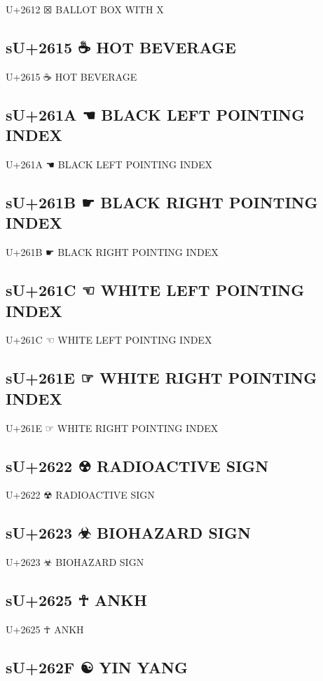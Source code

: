 U+2612 ☒ BALLOT BOX WITH X

\subsection{sU+2615 ☕ HOT BEVERAGE}

U+2615 ☕ HOT BEVERAGE

\subsection{sU+261A ☚ BLACK LEFT POINTING INDEX}

U+261A ☚ BLACK LEFT POINTING INDEX

\subsection{sU+261B ☛ BLACK RIGHT POINTING INDEX}

U+261B ☛ BLACK RIGHT POINTING INDEX

\subsection{sU+261C ☜ WHITE LEFT POINTING INDEX}

U+261C ☜ WHITE LEFT POINTING INDEX

\subsection{sU+261E ☞ WHITE RIGHT POINTING INDEX}

U+261E ☞ WHITE RIGHT POINTING INDEX

\subsection{sU+2622 ☢ RADIOACTIVE SIGN}

U+2622 ☢ RADIOACTIVE SIGN

\subsection{sU+2623 ☣ BIOHAZARD SIGN}

U+2623 ☣ BIOHAZARD SIGN

\subsection{sU+2625 ☥ ANKH}

U+2625 ☥ ANKH

\subsection{sU+262F ☯ YIN YANG}

